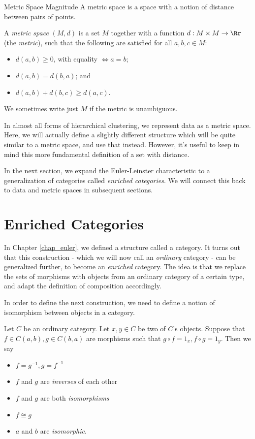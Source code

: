 \documentclass[12pt]{pom_thesis}
\begin{document}
\begin{chapter}{Metric Space Magnitude}
A metric space is a space with a notion of distance between pairs of points. 
\begin{defn}
A \textit{metric space} $(M,d)$ is a set $M$ together with a function  $d:M \times M \rightarrow \Rr$ (the \emph{metric}), such that the following are satisfied for all $a,b,c \in M$:
\begin{itemize}
\item $d(a,b) \geq 0$, with equality $\iff a = b$;
\item $d(a,b) = d(b,a)$; and
\item $d(a,b) + d(b,c) \geq d(a,c)$.
\end{itemize}
We sometimes write just $M$ if the metric is unambiguous.
\end{defn}

In almost all forms of hierarchical clustering, we represent data as a metric space. Here, we will actually define a slightly different structure which will be quite similar to a metric space, and use that instead. However, it's useful to keep in mind this more fundamental definition of a set with distance.

In the next section, we expand the Euler-Leinster characteristic to a generalization of categories called \emph{enriched categories}. We will connect this back to data and metric spaces in subsequent sections.
\section{Enriched Categories}
In Chapter \ref{chap_euler}, we defined a structure called a category. It turns out that this construction - which we will now call an \emph{ordinary} category - can be generalized further, to become an \emph{enriched} category. The idea is that we replace the sets of morphisms with objects from an ordinary category of a certain type, and adapt the definition of composition accordingly. 

In order to define the next construction, we need to define a notion of isomorphism between objects in a category.
\begin{defn}
Let $C$ be an ordinary category. Let $x,y \in C$ be two of $C$'s objects. Suppose that $f \in C(a,b), g \in C(b,a)$ are morphisms such that $g \circ f = 1_x, f \circ g = 1_y$. Then we say
\begin{itemize}
\item $f = g^{-1}, g = f^{-1}$
\item $f$ and $g$ are \emph{inverses} of each other
\item $f$ and $g$ are both \emph{isomorphisms}
\item $f \cong g$
\item $a$ and $b$ are \emph{isomorphic}.
\end{itemize}
\end{defn}


\end{chapter}
\end{document}
